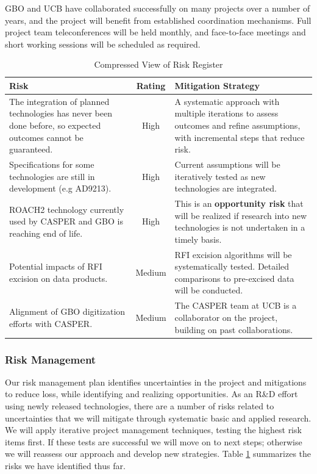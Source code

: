 \documentclass[10pt]{myNSF}
\begin{document}
GBO and UCB have collaborated successfully on many projects
over a number of years, and the project will benefit from established
coordination mechanisms. Full project team teleconferences will be
held monthly, and face-to-face meetings and short working sessions
will be scheduled as required.

\begin{table}[t]
  \centering
  \caption{Compressed View of Risk Register \label{table:risk_register}}
  \begin{tabular}{|p{2.4in}|c|p{3.05in}|}
    \hline
    Risk & Rating & Mitigation Strategy \\
    \hline
    The integration of planned technologies has never been done before, so expected outcomes cannot be guaranteed. & High & A systematic approach with multiple iterations to assess outcomes and refine assumptions, with incremental steps that reduce risk. \\
    \hline
    Specifications for some technologies are still in development (e.g AD9213). & High & Current assumptions will be iteratively tested as new technologies are integrated. \\
    \hline
    ROACH2 technology currently used by CASPER and GBO is reaching end of life. & High & This is an \textbf{opportunity risk} that will be realized if research into new technologies is not undertaken in a timely basis. \\
    \hline
    Potential impacts of RFI excision on data products. & Medium & RFI excision algorithms will be systematically tested.  Detailed comparisons to pre-excised data will be conducted. \\
    \hline
    Alignment of GBO digitization efforts with CASPER. & Medium & The CASPER team at UCB is a collaborator on the project, building on past collaborations. \\
    \hline
  \end{tabular}
\end{table}

\subsubsection{Risk Management}
\label{sec:risk_management}

Our risk management plan identifies uncertainties in the project and
mitigations to reduce loss, while identifying and realizing
opportunities. As an R\&D effort using newly released technologies,
there are a number of risks related to uncertainties that we will
mitigate through systematic basic and applied research.  We will apply
iterative project management techniques, testing the highest risk
items first.  If these tests are successful we will move on to next
steps; otherwise we will reassess our approach and develop new
strategies.  Table \ref{table:risk_register} summarizes the risks we
have identified thus far.
\end{document}
